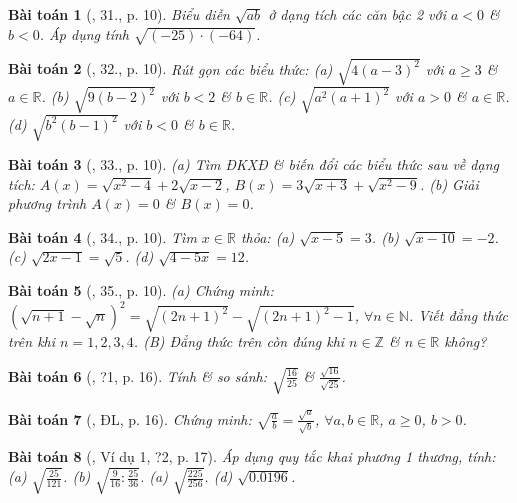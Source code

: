\documentclass{article}
\newtheorem{baitoan}{Bài toán}
\begin{document}
\begin{baitoan}[\cite{SBT_Toan_9_tap_1}, 31., p. 10]
	Biểu diễn $\sqrt{ab}$ ở dạng tích các căn bậc 2 với $a < 0$ \& $b < 0$. Áp dụng tính $\sqrt{(-25)\cdot(-64)}$.
\end{baitoan}

\begin{baitoan}[\cite{SBT_Toan_9_tap_1}, 32., p. 10]
	Rút gọn các biểu thức: (a) $\sqrt{4(a - 3)^2}$ với $a\ge3$ \& $a\in\mathbb{R}$. (b) $\sqrt{9(b - 2)^2}$ với $b < 2$ \& $b\in\mathbb{R}$. (c) $\sqrt{a^2(a + 1)^2}$ với $a > 0$ \& $a\in\mathbb{R}$. (d) $\sqrt{b^2(b - 1)^2}$ với $b < 0$ \& $b\in\mathbb{R}$.
\end{baitoan}

\begin{baitoan}[\cite{SBT_Toan_9_tap_1}, 33., p. 10]
	(a) Tìm ĐKXĐ \& biến đổi các biểu thức sau về dạng tích: $A(x) = \sqrt{x^2 - 4} + 2\sqrt{x - 2}$, $B(x) = 3\sqrt{x + 3} + \sqrt{x^2 - 9}$. (b) Giải phương trình $A(x) = 0$ \& $B(x) = 0$.
\end{baitoan}

\begin{baitoan}[\cite{SBT_Toan_9_tap_1}, 34., p. 10]
	Tìm $x\in\mathbb{R}$ thỏa: (a) $\sqrt{x - 5} = 3$. (b) $\sqrt{x - 10} = -2$. (c) $\sqrt{2x - 1} = \sqrt{5}$. (d) $\sqrt{4 - 5x} = 12$.
\end{baitoan}

\begin{baitoan}[\cite{SBT_Toan_9_tap_1}, 35., p. 10]
	(a) Chứng minh: $\left(\sqrt{n + 1} - \sqrt{n}\right)^2 = \sqrt{(2n + 1)^2} - \sqrt{(2n + 1)^2 - 1}$, $\forall n\in\mathbb{N}$. Viết đẳng thức trên khi $n = 1,2,3,4$. (B) Đẳng thức trên còn đúng khi $n\in\mathbb{Z}$ \& $n\in\mathbb{R}$ không?
\end{baitoan}

\begin{baitoan}[\cite{SGK_Toan_9_tap_1}, ?1, p. 16]
	Tính \& so sánh: $\sqrt{\frac{16}{25}}$ \& $\frac{\sqrt{16}}{\sqrt{25}}$.
\end{baitoan}

\begin{baitoan}[\cite{SGK_Toan_9_tap_1}, ĐL, p. 16]
	Chứng minh: $\sqrt{\frac{a}{b}} = \frac{\sqrt{a}}{\sqrt{b}}$, $\forall a,b\in\mathbb{R}$, $a\ge0$, $b > 0$.
\end{baitoan}

\begin{baitoan}[\cite{SGK_Toan_9_tap_1}, Ví dụ 1, ?2, p. 17]
	Áp dụng quy tắc khai phương 1 thương, tính: (a) $\sqrt{\frac{25}{121}}$. (b) $\sqrt{\frac{9}{16}:\frac{25}{36}}$. (a) $\sqrt{\frac{225}{256}}$. (d) $\sqrt{0.0196}$.
\end{baitoan}
\end{document}
